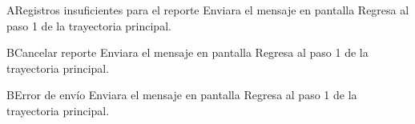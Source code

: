		\begin{UCtrayectoriaA}{A}{Registros insuficientes para el reporte}
			\UCpaso[\UCsist] Enviara el  mensaje en pantalla 
			\UCpaso[\UCsist] Regresa al paso 1 de la trayectoria principal.
		\end{UCtrayectoriaA}
		
		
		\begin{UCtrayectoriaA}{B}{Cancelar reporte}
			\UCpaso[\UCsist] Enviara el mensaje en pantalla 
			\UCpaso[\UCsist] Regresa al paso 1 de la trayectoria principal.
		\end{UCtrayectoriaA}	
		
		\begin{UCtrayectoriaA}{B}{Error de envío}
			\UCpaso[\UCsist] Enviara el mensaje en pantalla 
			\UCpaso[\UCsist] Regresa al paso 1 de la trayectoria principal.
		\end{UCtrayectoriaA}			
		
		
		
		
